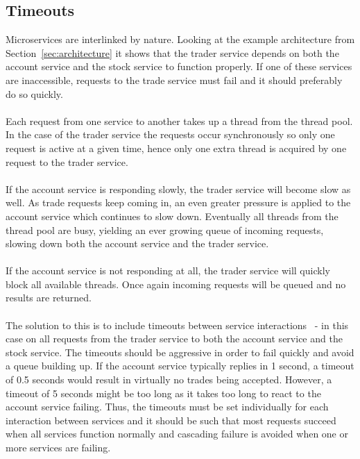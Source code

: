 \subsection{Timeouts}
Microservices are interlinked by nature. Looking at the example
architecture from Section~\ref{sec:architecture} it shows that the
trader service depends on both the account service and the stock
service to function properly. If one of these services are
inaccessible, requests to the trade service must fail and it should
preferably do so quickly.
\\\\
Each request from one service to another takes up a thread from the
thread pool. In the case of the trader service the requests occur
synchronously so only one request is active at a given time, hence
only one extra thread is acquired by one request to the trader
service.
\\\\
If the account service is responding slowly, the trader service will
become slow as well. As trade requests keep coming in, an even greater
pressure is applied to the account service which continues to slow
down. Eventually all threads from the thread pool are busy, yielding an
ever growing queue of incoming requests, slowing down both the account
service and the trader service.
\\\\
If the account service is not responding at all, the trader service
will quickly block all available threads. Once again incoming requests
will be queued and no results are returned.
\\\\
The solution to this is to include timeouts between service
interactions~\cite{avanza} - in this case on all requests from the
trader service to both the account service and the stock service. The
timeouts should be aggressive in order to fail quickly and avoid a
queue building up. If the account service typically replies in 1
second, a timeout of 0.5 seconds would result in virtually no trades
being accepted. However, a timeout of 5 seconds might be too long as
it takes too long to react to the account service failing. Thus, the
timeouts must be set individually for each interaction between
services and it should be such that most requests succeed when all
services function normally and cascading failure is avoided when one
or more services are failing.
 
